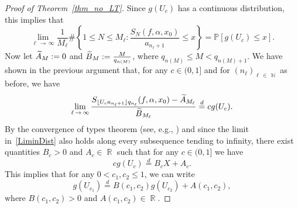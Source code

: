 \documentclass[AHL,Unicode,longabstracts,published]{cedram}
\DeclareMathOperator{\R}{\mathbb{R}}
\DeclareMathOperator{\N}{\mathbb{N}}
\newcommand{\bbP}{\mathbb{P}}
\let\oldtilde\tilde
\renewcommand*{\tilde}[1]{\mathchoice{\widetilde{#1}}{\widetilde{#1}}{\oldtilde{#1}}{\oldtilde{#1}}}
\begin{document}
\begin{proof}[Proof of Theorem~\ref{thm_no_LT}]
Since $g(U_c)$ has a continuous distribution, this implies that
\[
\lim_{\ell\,\rightarrow\,\infty} \frac{1}{M_{\ell}} \# \left \{ 1 \leq N \leq M_{\ell} : \frac{S_N(f, \alpha, x_0)}{a_{n_{\ell}+1}} \leq x \right \} = \bbP \left [g(U_c) \leq x \right].
\]
Now let $ \tilde{A}_M := 0$ and $\tilde{B}_M := \frac{M}{q_{n(M)}}$, where $q_{n(M)} \leq M < q_{n(M) +1}$. We have shown in the previous argument that, for any $c \in (0,1]$ and for $ (n_\ell)_{\ell\,\in\,\N}$ as before, we have
\begin{equation*}
\lim_{\ell\,\to\,\infty} \frac{S_{ \lfloor U_c a_{n_{\ell}+1} \rfloor q_{n_{\ell}} }(f, \alpha, x_0) - \tilde{A}_{M_\ell} }{\tilde{B}_{M_\ell}} \stackrel{d}{=} c g(U_c).
\end{equation*}
By the convergence of types theorem (see, e.g., \cite[Theorem~14.2]{billingsley}) and since the limit in~\eqref{LiminDist} also holds along every subsequence tending to infinity, there exist quantities $B_c > 0$ and $A_c \in \R$ such that for any $c \in (0,1]$ we have
\begin{equation*}
c g(U_c) \stackrel{d}{=} B_c X + A_c.
\end{equation*}
This implies that for any $0 < c_1, c_2 \leq 1$, we can write
\begin{equation}\label{EqEqinDist}
g(U_{c_1}) \stackrel{d}{=} B(c_1, c_2) g(U_{c_2}) + A(c_1, c_2),
\end{equation}
where $B(c_1, c_2) > 0$ and $A(c_1, c_2) \in \R$.


\end{proof}
\end{document}
